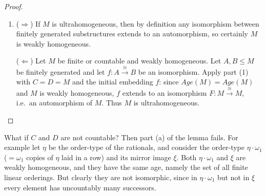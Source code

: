 \begin{proof}
\begin{enumerate}[a]
              We now expand the image to cover $D_{n+1}$.
              Consider the inverse isomorphism
              \[
                  (f_{n+1/2})^{-1}\colon D_{n+1/2}' \xrightarrow{\ \cong\ } C_{n+1/2}'.
              \]
              By $Age(D)=Age(C)$ and weak homogeneity of $C$, apply Lemma~7.1.3 (with roles of $C,D$ swapped) to extend
              $(f_{n+1/2})^{-1}$ to an embedding $\widetilde g\colon D\hookrightarrow C$.
              Let $\widehat D:=\langle D_{n+1/2}'\cup D_{n+1}\rangle\le D$ and set
              \[
                  f_{n+1}\ :=\ \big(\,\widetilde g\!\upharpoonright_{\widehat D}\,\big)^{-1}\ \colon\
                  \widetilde g(\widehat D)\xrightarrow{\ \cong\ }\widehat D.
              \]
              Then $f_{n+1}$ extends $f_{n+1/2}$ (hence $f_n$), and its image contains $D_{n+1}$.

              This completes the construction satisfying (I1)–(I4), hence the union $F$ is the required
              isomorphism $C\xrightarrow{\ \cong\ }D$ extending the given $f$.




        \item
              (\(\Rightarrow\)) If $M$ is ultrahomogeneous, then by definition any isomorphism  between finitely generated substructures extends to an automorphism, so certainly  $M$ is weakly homogeneous.


              (\(\Leftarrow\)) Let $M$ be finite or countable and weakly homogeneous.  Let $A,B\le M$ be finitely generated and let $f\colon A\xrightarrow{\ \cong\ }B$ be an isomorphism.  Apply part (1) with $C=D=M$ and the initial embedding $f$:  since $Age(M)=Age(M)$ and $M$ is weakly homogeneous, $f$ extends to an  isomorphism $F\colon M\xrightarrow{\ \cong\ }M$, i.e.\ an automorphism of $M$.  Thus $M$ is ultrahomogeneous.
    \end{enumerate}
\end{proof}

What if \( C \) and \( D \) are not countable? Then part (a) of the lemma fails. For    example let \( \eta \) be the order-type of the rationals, and consider the order-type   \( \eta \cdot \omega_1 \) (\(= \omega_1 \) copies of \( \eta \) laid in a row) and its mirror image \( \xi \).  Both \( \eta \cdot \omega_1 \) and \( \xi \) are weakly homogeneous, and they have the same age,  namely the set of all finite linear orderings. But clearly they are not isomorphic, since  in \( \eta \cdot \omega_1 \) but not in \( \xi \) every element has uncountably many successors.



